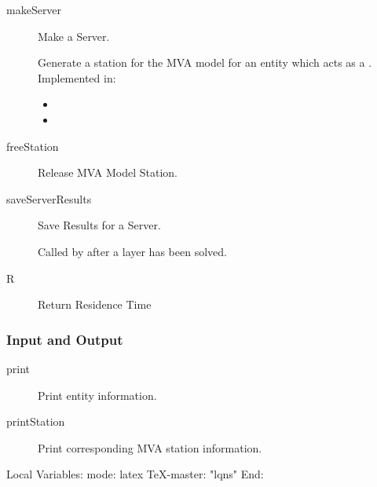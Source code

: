 \begin{description}

\label{sec:entity-makeServer}
\item[makeServer] \texonly{---} Make a Server.\\

Generate a station for the MVA model for an entity which acts as a
.  Implemented in:
\begin{itemize}
\item {}
\item {}
\end{itemize}

\item[freeStation] \texonly{---} Release MVA Model Station.\\

\label{sec:entity-saveServerResults}
\item[saveServerResults] \texonly{---} Save Results for a Server.\\

Called by  after a layer has been
solved. 

\item[R] \texonly{---} Return Residence Time\\

\end{description}
\subsubsection{Input and Output}

\begin{description}
\item[print] \texonly{---} Print entity information.\\

\item[printStation] \texonly{---} Print corresponding MVA station information.\\

\end{description}

\C Local Variables: 
\C mode: latex
\C TeX-master: "lqns"
\C End: 
